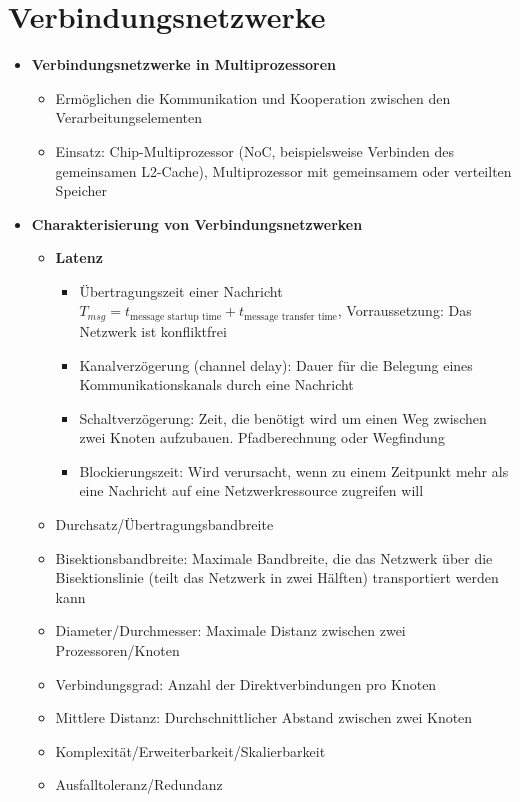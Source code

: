 \section{Verbindungsnetzwerke}
	\begin{itemize}
		\item \textbf{Verbindungsnetzwerke in Multiprozessoren}
		\begin{itemize}
			\item Ermöglichen die Kommunikation und Kooperation zwischen den Verarbeitungselementen
			\item Einsatz: Chip-Multiprozessor (NoC, beispielsweise Verbinden des gemeinsamen L2-Cache), Multiprozessor mit gemeinsamem oder verteilten Speicher
		\end{itemize}
		\item \textbf{Charakterisierung von Verbindungsnetzwerken}
		\begin{itemize}
			\item \textbf{Latenz}
			\begin{itemize}
				\item Übertragungszeit einer Nachricht \(T_{msg}=t_{\text{message startup time}}+t_{\text{message transfer time}}\), Vorraussetzung: Das Netzwerk ist konfliktfrei
				\item Kanalverzögerung (channel delay): Dauer für die Belegung eines Kommunikationskanals durch eine Nachricht
				\item Schaltverzögerung: Zeit, die benötigt wird um einen Weg zwischen zwei Knoten aufzubauen. Pfadberechnung oder Wegfindung
				\item Blockierungszeit: Wird verursacht, wenn zu einem Zeitpunkt mehr als eine Nachricht auf eine Netzwerkressource zugreifen will
			\end{itemize}
			\item Durchsatz/Übertragungsbandbreite
			\item Bisektionsbandbreite: Maximale Bandbreite, die das Netzwerk über die Bisektionslinie (teilt das Netzwerk in zwei Hälften) transportiert werden kann
			\item Diameter/Durchmesser: Maximale Distanz zwischen zwei Prozessoren/Knoten
			\item Verbindungsgrad: Anzahl der Direktverbindungen pro Knoten
			\item Mittlere Distanz: Durchschnittlicher Abstand zwischen zwei Knoten
			\item Komplexität/Erweiterbarkeit/Skalierbarkeit
			\item Ausfalltoleranz/Redundanz

\end{itemize}
\end{itemize}
